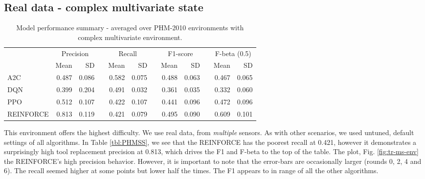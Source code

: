 \documentclass[a4paper, 12pt]{article}
\newcommand{\rowspace}[1]{\renewcommand{\arraystretch}{#1}}
\begin{document}
\subsection{Real data - complex multivariate state}
\begin{table}[!htb]\centering
	\sffamily
	\rowspace{1.3}
	\begin{tabular}{@{}l rr c rr c rr c rr@{}}
		\arrayrulecolor{black!40}\toprule
		& \multicolumn{2}{c}{Precision} & \phantom{i} & \multicolumn{2}{c}{Recall} & \phantom{i} & \multicolumn{2}{c}{F1-score} & \phantom{i} & \multicolumn{2}{c}{F-beta (0.5)} \\
		\cmidrule{2-3} \cmidrule{5-6} \cmidrule{8-9} \cmidrule{11-12} 
		
		&Mean &SD & &Mean &SD & &Mean &SD& &Mean & SD\\ \midrule
		A2C & 0.487 & 0.086 & &0.582 & 0.075 & & 0.488 & 0.063 & &0.467 &0.065 \\
		DQN & 0.399 & 0.204 & &0.491 & 0.032 & & 0.361 & 0.035 & &0.332 &0.060 \\
		PPO & 0.512 & 0.107 & &0.422 & 0.107 & & 0.441 & 0.096 & &0.472 &0.096 \\
		REINFORCE & 0.813 & 0.119 & &0.421 & 0.079 & & 0.495 & 0.090 & &0.609 &0.101 \\
		\bottomrule
	\end{tabular}
	\caption{Model performance summary - averaged over PHM-2010 environments with complex multivariate environment.}
	\label{tbl:PHMMS}
\end{table}
This environment offers the highest difficulty. We use real data, from \textit{multiple} sensors. As with other scenarios, we used untuned, default settings of all algorithms. In Table \ref{tbl:PHMSS}, we see that the REINFORCE has the poorest recall at 0.421, however it demonstrates a surprisingly high tool replacement precision at 0.813, which drives the F1 and F-beta to the top of the table. The plot, Fig. \ref{fig:tr-ms-env} the REINFORCE's high precision behavior. However, it is important to note that the error-bars are occasionally larger (rounds 0, 2, 4 and 6). The recall seemed higher at some points but lower half the times. The F1 appears to in range of all the other algorithms.
\end{document}
